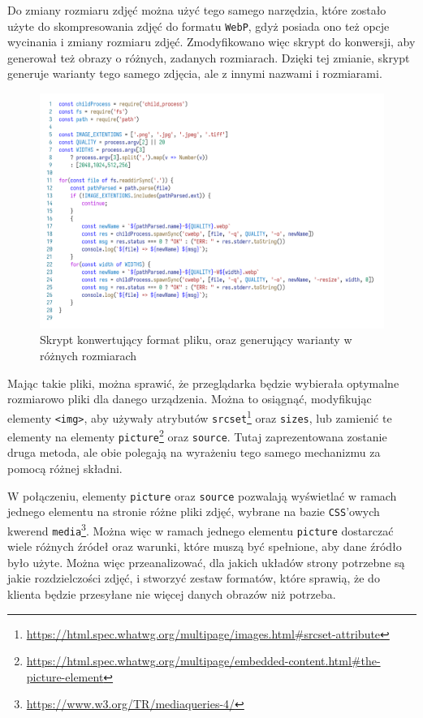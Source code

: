 \documentclass[licencjacka]{pracadypl}
\begin{document}
Do zmiany rozmiaru zdjęć można użyć tego samego narzędzia, które zostało użyte do skompresowania zdjęć do formatu \texttt{WebP}, gdyż posiada ono też opcje wycinania i zmiany rozmiaru zdjęć. Zmodyfikowano więc skrypt do konwersji, aby generował też obrazy o różnych, zadanych rozmiarach. 
Dzięki tej zmianie, skrypt generuje warianty tego samego zdjęcia, ale z innymi nazwami i rozmiarami.

\begin{figure}[H]
  \centering
  \includegraphics[width=\linewidth/\real{1.1}]{images/code_script_conv_format_and_size.png}
  \caption{Skrypt konwertujący format pliku, oraz generujący warianty w różnych rozmiarach}
  \label{fig:script-format-and-size}
\end{figure}

Mając takie pliki, można sprawić, że przeglądarka będzie wybierała optymalne rozmiarowo pliki dla danego urządzenia. Można to osiągnąć, modyfikując elementy \texttt{<img>}, aby używały atrybutów \texttt{srcset}\footnote{\url{https://html.spec.whatwg.org/multipage/images.html\#srcset-attribute}} oraz \texttt{sizes}, lub zamienić te elementy na elementy \texttt{picture}\footnote{\url{https://html.spec.whatwg.org/multipage/embedded-content.html\#the-picture-element}} oraz \texttt{source}. Tutaj zaprezentowana zostanie druga metoda, ale obie polegają na wyrażeniu tego samego mechanizmu za pomocą różnej składni.

W połączeniu, elementy \texttt{picture} oraz \texttt{source} pozwalają wyświetlać w ramach jednego elementu na stronie różne pliki zdjęć, wybrane na bazie \texttt{CSS}'owych kwerend \texttt{media}\footnote{\url{https://www.w3.org/TR/mediaqueries-4/}}. Można więc w ramach jednego elementu \texttt{picture} dostarczać wiele różnych źródeł oraz warunki, które muszą być spełnione, aby dane źródło było użyte. Można więc przeanalizować, dla jakich układów strony potrzebne są jakie rozdzielczości zdjęć, i stworzyć zestaw formatów, które sprawią, że do klienta będzie przesyłane nie więcej danych obrazów niż potrzeba.
\end{document}
